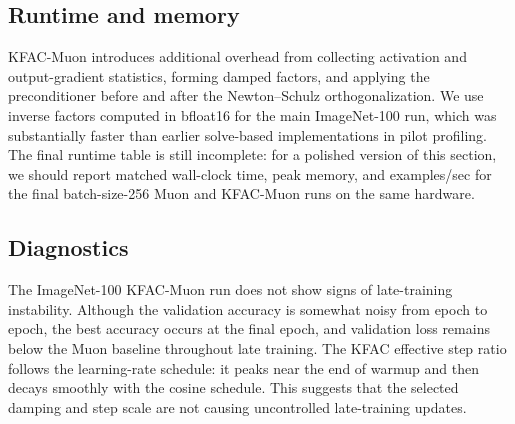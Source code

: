 \subsection{Runtime and memory}
\label{sec:experiments-runtime}

KFAC-Muon introduces additional overhead from collecting activation and output-gradient statistics, forming damped factors, and applying the preconditioner before and after the Newton--Schulz orthogonalization. We use inverse factors computed in bfloat16 for the main ImageNet-100 run, which was substantially faster than earlier solve-based implementations in pilot profiling. The final runtime table is still incomplete: for a polished version of this section, we should report matched wall-clock time, peak memory, and examples/sec for the final batch-size-256 Muon and KFAC-Muon runs on the same hardware.

\subsection{Diagnostics}
\label{sec:experiments-diagnostics}

The ImageNet-100 KFAC-Muon run does not show signs of late-training instability. Although the validation accuracy is somewhat noisy from epoch to epoch, the best accuracy occurs at the final epoch, and validation loss remains below the Muon baseline throughout late training. The KFAC effective step ratio follows the learning-rate schedule: it peaks near the end of warmup and then decays smoothly with the cosine schedule. This suggests that the selected damping and step scale are not causing uncontrolled late-training updates.
